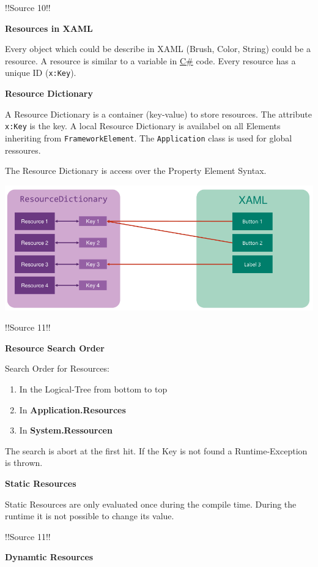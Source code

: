 \documentclass[10pt,twoside,landscape]{article}
\begin{document}
\begin{multicols}{3}
!!Source 10!!

\textbf{Resources in XAML}

Every object which could be describe in XAML (Brush, Color, String) could be a resource.
A resource is similar to a variable in \href{../../../roam/20211003114158-c.org}{C\#} code.
Every resource has a unique ID (\texttt{x:Key}).

\textbf{Resource Dictionary}

A Resource Dictionary is a container (key-value) to store resources.
The attribute \texttt{x:Key} is the key.
A local Resource Dictionary is availabel on all Elements inheriting from \texttt{FrameworkElement}.
The \texttt{Application} class is used for global ressoures.

The Resource Dictionary is access over the Property Element Syntax.

\begin{center}
\includegraphics[width=.9\linewidth]{img/resource_dictionary.png}
\end{center}

!!Source 11!!

\textbf{Resource Search Order}

Search Order for Resources:
\begin{enumerate}
\item In the Logical-Tree from bottom to top
\item In \textbf{Application.Resources}
\item In \textbf{System.Ressourcen}
\end{enumerate}

The search is abort at the first hit.
If the Key is not found a Runtime-Exception is thrown.

\textbf{Static Resources}

Static Resources are only evaluated once during the compile time.
During the runtime it is not possible to change its value.

!!Source 11!!

\textbf{Dynamtic Resources}


\end{multicols}
\end{document}
